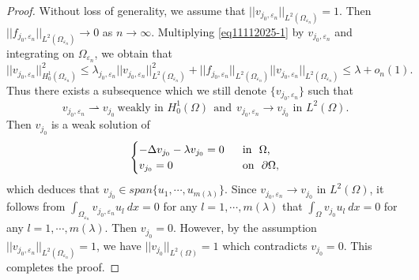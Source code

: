 \documentclass[11pt,reqno]{article}
\numberwithin{equation}{section}
\newcommand\e\varepsilon
\renewcommand\O\Omega
\begin{document}
\begin{proof}
Without loss of generality, we assume that $||{v}_{j_0,\e_n}||_{L^2(\O_{\e_n})}=1$. 
Then  $||f_{j_0,\e_n}||_{L^2(\O_{\e_n})}\to 0$ as $n\to \infty$. Multiplying \eqref{eq11112025-1} by ${v}_{j_0,\e_n}$ and integrating on $\O_{\e_n}$, we obtain that
\begin{equation*}
    ||{v}_{j_0,\e_n}||_{H_0^1(\O_{\e_n})}^2\leq \lambda_{j_0,\e_n}||{v}_{j_0,\e_n}||_{L^2(\O_{\e_n})}^2+||f_{j_0,\e_n}||_{L^2(\O_{\e_n})}||{v}_{j_0,\e_n}||_{L^2(\O_{\e_n})}\leq \lambda+o_n(1).
\end{equation*}
Thus there exists a subsequence  which we still denote $\{{v}_{j_0,\e_n}\}$ such that 
$${v}_{j_0,\e_n}\rightharpoonup{v}_{j_0} \ \text{weakly in }H_0^1(\O)\ \  \text{and} \  \ {v}_{j_0,\e_n}\to{v}_{j_0} \text{ in }L^2(\O). $$
Then ${v}_{j_0}$ is a weak solution of 
\begin{equation*}
    \begin{cases}
       \displaystyle -\Delta {v}_{j_0}-\lambda{v}_{j_0}=0\ \ &\hbox{in} \ \ \O,\\
       \displaystyle {v}_{j_0}=0\ \ &\hbox{on} \ \ \partial\O,\\
    \end{cases}
\end{equation*}
which deduces that ${v}_{j_0}\in span\{u_1,\cdots,u_{m(\lambda)}\}$. 
Since ${v}_{j_0,\e_n}\to{v}_{j_0} \text{ in }L^2(\O)$,  it follows from
$
\int_{\O_{\e_n}}{v}_{j_0,\e_n}u_l \ dx=0$  for any  $ l=1,\cdots,m(\lambda)
$
that $\int_{\O}{v}_{j_0}u_l \ dx=0$ for any $l=1,\cdots,m(\lambda)$. Then ${v}_{j_0}=0$. However, by the assumption $||{v}_{j_0,\e_n}||_{L^2(\O_{\e_n})}=1$, we have  $||{v}_{j_0}||_{L^2(\O)}=1$ which  contradicts ${v}_{j_0}=0$. This completes the proof.
     \end{proof}
\end{document}
